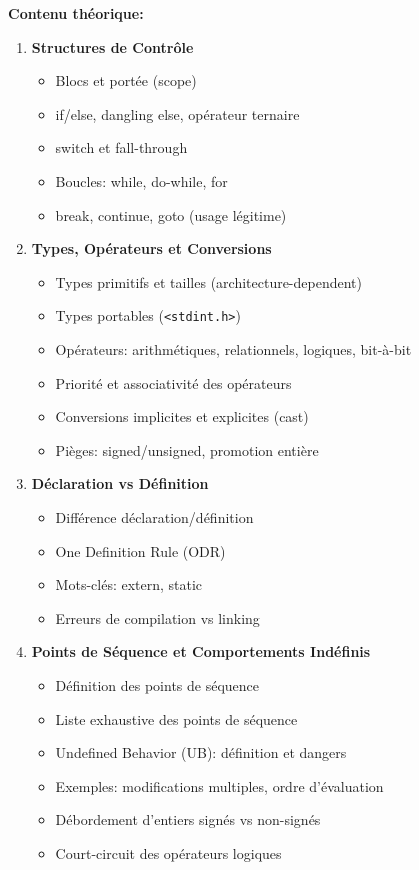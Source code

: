 \documentclass[10pt,a4paper]{article}
\begin{document}
\textbf{Contenu théorique:}
\begin{enumerate}
\item \textbf{Structures de Contrôle}
   \begin{itemize}
   \item Blocs et portée (scope)
   \item if/else, dangling else, opérateur ternaire
   \item switch et fall-through
   \item Boucles: while, do-while, for
   \item break, continue, goto (usage légitime)
   \end{itemize}

\item \textbf{Types, Opérateurs et Conversions}
   \begin{itemize}
   \item Types primitifs et tailles (architecture-dependent)
   \item Types portables (\texttt{<stdint.h>})
   \item Opérateurs: arithmétiques, relationnels, logiques, bit-à-bit
   \item Priorité et associativité des opérateurs
   \item Conversions implicites et explicites (cast)
   \item Pièges: signed/unsigned, promotion entière
   \end{itemize}

\item \textbf{Déclaration vs Définition}
   \begin{itemize}
   \item Différence déclaration/définition
   \item One Definition Rule (ODR)
   \item Mots-clés: extern, static
   \item Erreurs de compilation vs linking
   \end{itemize}

\item \textbf{Points de Séquence et Comportements Indéfinis}
   \begin{itemize}
   \item Définition des points de séquence
   \item Liste exhaustive des points de séquence
   \item Undefined Behavior (UB): définition et dangers
   \item Exemples: modifications multiples, ordre d'évaluation
   \item Débordement d'entiers signés vs non-signés
   \item Court-circuit des opérateurs logiques
   \end{itemize}


\end{enumerate}
\end{document}
